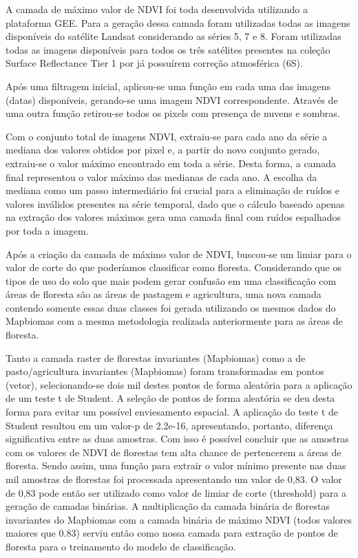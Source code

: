 \documentclass[12pt,a4paper]{article}
\begin{document}
A camada de máximo valor de NDVI foi toda desenvolvida utilizando a plataforma GEE. Para a geração dessa camada foram utilizadas todas as imagens disponíveis do satélite Landsat considerando as séries 5, 7 e 8. Foram utilizadas todas as imagens disponíveis para todos os três satélites presentes na coleção Surface Reflectance Tier 1 por já possuírem correção atmosférica (6S).

Após uma filtragem inicial, aplicou-se uma função em cada uma das imagens (datas) disponíveis, gerando-se uma imagem NDVI correspondente. Através de uma outra função retirou-se todos os pixels com presença de nuvens e sombras.

Com o conjunto total de imagens NDVI, extraiu-se para cada ano da série a mediana dos valores obtidos por pixel e, a partir do novo conjunto gerado, extraiu-se o valor máximo encontrado em toda a série. Desta forma, a camada final representou o valor máximo das medianas de cada ano. A escolha da mediana como um passo intermediário foi crucial para a eliminação de ruídos e valores inválidos presentes na série temporal, dado que o cálculo baseado apenas na extração dos valores máximos gera uma camada final com ruídos espalhados por toda a imagem.

Após a criação da camada de máximo valor de NDVI, buscou-se um limiar para o valor de corte do que poderíamos classificar como floresta. Considerando que os tipos de uso do solo que mais podem gerar confusão em uma classificação com áreas de floresta são as áreas de pastagem e agricultura, uma nova camada contendo somente essas duas classes foi gerada utilizando os mesmos dados do Mapbiomas com a mesma metodologia realizada anteriormente para as áreas de floresta.

Tanto a camada raster de florestas invariantes (Mapbiomas) como a de pasto/agricultura invariantes (Mapbiomas) foram transformadas em pontos (vetor), selecionando-se dois mil destes pontos de forma aleatória para a aplicação de um teste t de Student. A seleção de pontos de forma aleatória se deu desta forma para evitar um possível enviesamento espacial. A aplicação do teste t de Student resultou em um valor-p de 2.2e-16, apresentando, portanto, diferença significativa entre as duas amostras. Com isso é possível concluir que as amostras com os valores de NDVI de florestas tem alta chance de pertencerem a áreas de floresta. Sendo assim, uma função para extrair o valor mínimo presente nas duas mil amostras de florestas foi processada apresentando um valor de 0,83. O valor de 0,83 pode então ser utilizado como valor de limiar de corte (threshold) para a geração de camadas binárias. A multiplicação da camada binária de florestas invariantes do Mapbiomas com a camada binária de máximo NDVI (todos valores maiores que 0.83) serviu então como nossa camada para extração de pontos de floresta para o treinamento do modelo de classificação.
\end{document}
